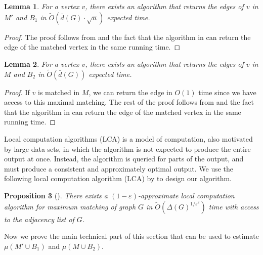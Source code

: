 \documentclass[letterpaper,11pt]{article}
\renewcommand{\epsilon}{\varepsilon}
\newcommand{\wt}[1]{\ensuremath{\widetilde{#1}}}
\newtheorem{lemma}{Lemma}[section]
\newtheorem{proposition}[lemma]{Proposition}
\begin{document}
\begin{lemma}\label{lem:edge-oracle-1}
    For a vertex $v$, there exists an algorithm that returns the edges of $v$ in $M'$ and $B_1$ in $\wt{O}(\bar{d}(G) \cdot \sqrt{n})$ expected time.
\end{lemma}
\begin{proof}
    The proof follows from  and the fact that the algorithm in  can return the edge of the matched vertex in the same running time.
\end{proof}

\begin{lemma}\label{lem:edge-oracle-2}
    For a vertex $v$, there exists an algorithm that returns the edges of $v$ in $M$ and $B_2$ in $\wt{O}(\bar{d}(G))$ expected time.
\end{lemma}
\begin{proof}
    If $v$ is matched in $M$, we can return the edge in $O(1)$ time since we have access to this maximal matching. The rest of the proof follows from  and the fact that the algorithm in  can return the edge of the matched vertex in the same running time.
\end{proof}

Local computation algorithms (LCA) is a model of computation, also motivated by large data sets, in which the algorithm is not expected to produce the entire output at once. Instead, the algorithm is queried for parts of the output, and must produce a consistent and approximately optimal output. We use the following local computation algorithm (LCA) by \cite{LeviRY17} to design our algorithm. 

\begin{proposition}[\cite{LeviRY17}]\label{prop:lca}
    There exists a $(1-\epsilon)$-approximate local computation algorithm for maximum matching of graph $G$ in $\wt{O}(\Delta(G)^{1/\epsilon^2})$ time with access to the adjacency list of $G$.
\end{proposition}

Now we prove the main technical part of this section that can be used to estimate $\mu(M' \cup B_1)$ and $\mu(M \cup B_2)$.
\end{document}
